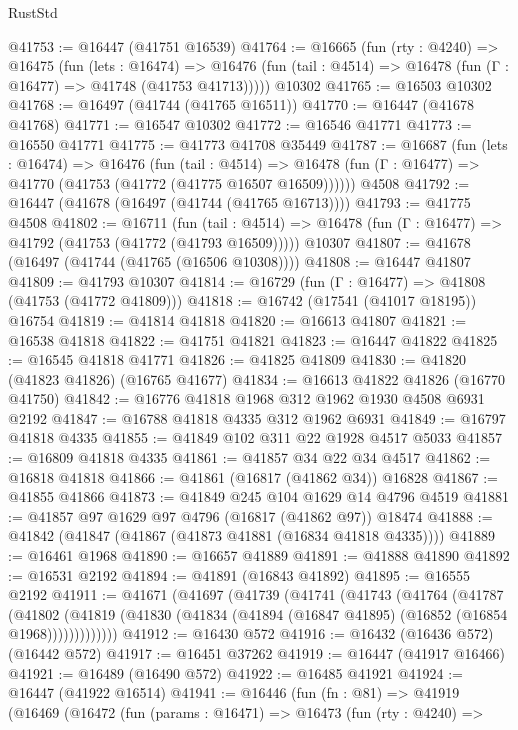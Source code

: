 \begin{lexlean}{RustStd}
\begin{coremodule}
{\begin{coremodule}
{{{{{{{{{{{{{{{{{{{{{{{{{{{{{{{{{{{{{{{{{{{{{{{{{{{{{{{@41753 := @16447 (@41751 @16539)
@41764 := @16665
    (fun (rty : @4240) =>
    @16475
      (fun (lets : @16474) =>
      @16476 (fun (tail : @4514) => @16478 (fun (Γ : @16477) => @41748 (@41753 @41713)))))
    @10302
@41765 := @16503 @10302
@41768 := @16497 (@41744 (@41765 @16511))
@41770 := @16447 (@41678 @41768)
@41771 := @16547 @10302
@41772 := @16546 @41771
@41773 := @16550 @41771
@41775 := @41773 @41708 @35449
@41787 := @16687
    (fun (lets : @16474) =>
    @16476
      (fun (tail : @4514) =>
      @16478 (fun (Γ : @16477) => @41770 (@41753 (@41772 (@41775 @16507 @16509))))))
    @4508
@41792 := @16447 (@41678 (@16497 (@41744 (@41765 @16713))))
@41793 := @41775 @4508
@41802 := @16711
    (fun (tail : @4514) => @16478 (fun (Γ : @16477) => @41792 (@41753 (@41772 (@41793 @16509)))))
    @10307
@41807 := @41678 (@16497 (@41744 (@41765 (@16506 @10308))))
@41808 := @16447 @41807
@41809 := @41793 @10307
@41814 := @16729 (fun (Γ : @16477) => @41808 (@41753 (@41772 @41809)))
@41818 := @16742 (@17541 (@41017 @18195)) @16754
@41819 := @41814 @41818
@41820 := @16613 @41807
@41821 := @16538 @41818
@41822 := @41751 @41821
@41823 := @16447 @41822
@41825 := @16545 @41818 @41771
@41826 := @41825 @41809
@41830 := @41820 (@41823 @41826) (@16765 @41677)
@41834 := @16613 @41822 @41826 (@16770 @41750)
@41842 := @16776 @41818 @1968 @312 @1962 @1930 @4508 @6931 @2192
@41847 := @16788 @41818 @4335 @312 @1962 @6931
@41849 := @16797 @41818 @4335
@41855 := @41849 @102 @311 @22 @1928 @4517 @5033
@41857 := @16809 @41818 @4335
@41861 := @41857 @34 @22 @34 @4517
@41862 := @16818 @41818
@41866 := @41861 (@16817 (@41862 @34)) @16828
@41867 := @41855 @41866
@41873 := @41849 @245 @104 @1629 @14 @4796 @4519
@41881 := @41857 @97 @1629 @97 @4796 (@16817 (@41862 @97)) @18474
@41888 := @41842 (@41847 (@41867 (@41873 @41881 (@16834 @41818 @4335))))
@41889 := @16461 @1968
@41890 := @16657 @41889
@41891 := @41888 @41890
@41892 := @16531 @2192
@41894 := @41891 (@16843 @41892)
@41895 := @16555 @2192
@41911 := @41671
    (@41697
      (@41739
        (@41741
          (@41743
            (@41764
              (@41787
                (@41802
                  (@41819 (@41830 (@41834 (@41894 (@16847 @41895) (@16852 (@16854 @1968)))))))))))))
@41912 := @16430 @572
@41916 := @16432 (@16436 @572) (@16442 @572)
@41917 := @16451 @37262
@41919 := @16447 (@41917 @16466)
@41921 := @16489 (@16490 @572)
@41922 := @16485 @41921
@41924 := @16447 (@41922 @16514)
@41941 := @16446
    (fun (fn : @81) =>
    @41919
      (@16469
        (@16472
          (fun (params : @16471) =>
          @16473
            (fun (rty : @4240) =>
}}}}}}}}}}}}}}}}}}}}}}}}}}}}}}}}}}}}}}}}}}}}}}}}}}}}}}}
\end{coremodule}}
\end{coremodule}
\end{lexlean}
